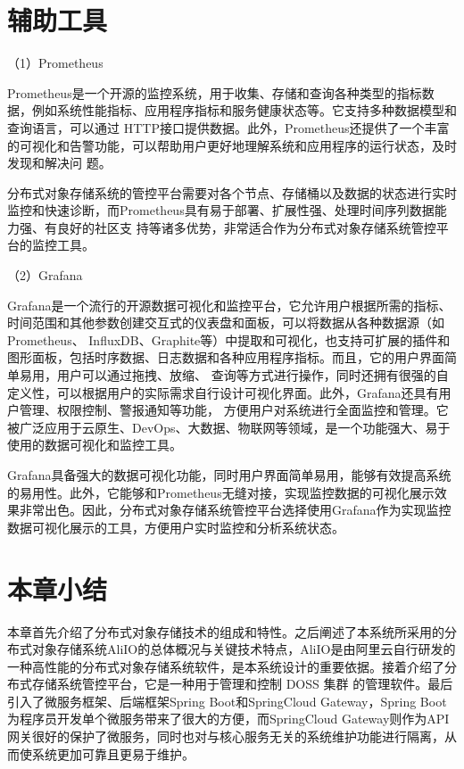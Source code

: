 \section{辅助工具}

（1）Prometheus

Prometheus是一个开源的监控系统，用于收集、存储和查询各种类型的指标数据\cite{kng2562eji}，例如系统性能指标、应用程序指标和服务健康状态等。它支持多种数据模型和查询语言，可以通过
HTTP接口提供数据。此外，Prometheus还提供了一个丰富的可视化和告警功能\cite{kongqingy2015keji}，可以帮助用户更好地理解系统和应用程序的运行状态，及时发现和解决问
题。

分布式对象存储系统的管控平台需要对各个节点、存储桶以及数据的状态进行实时监控和快速诊断，而Prometheus具有易于部署、扩展性强、处理时间序列数据能力强、有良好的社区支
持等诸多优势，非常适合作为分布式对象存储系统管控平台的监控工具。

（2）Grafana

Grafana是一个流行的开源数据可视化和监控平台，它允许用户根据所需的指标、时间范围和其他参数创建交互式的仪表盘和面板\cite{koing2keji}，可以将数据从各种数据源（如Prometheus、
InfluxDB、Graphite等）中提取和可视化，也支持可扩展的插件和图形面板，包括时序数据、日志数据和各种应用程序指标。而且，它的用户界面简单易用，用户可以通过拖拽、放缩、
查询等方式进行操作，同时还拥有很强的自定义性，可以根据用户的实际需求自行设计可视化界面。此外，Grafana还具有用户管理、权限控制、警报通知等功能，
方便用户对系统进行全面监控和管理\cite{koi56keji}。它被广泛应用于云原生、DevOps、大数据、物联网等领域，是一个功能强大、易于使用的数据可视化和监控工具。

Grafana具备强大的数据可视化功能，同时用户界面简单易用，能够有效提高系统的易用性。此外，它能够和Prometheus无缝对接，实现监控数据的可视化展示效果非常出色。因此，分布式对象存储系统管控平台选择使用Grafana作为实现监控数据可视化展示的工具，方便用户实时监控和分析系统状态。
\section{本章小结}

本章首先介绍了分布式对象存储技术的组成和特性。之后阐述了本系统所采用的分布式对象存储系统AliIO的总体概况与关键技术特点，AliIO是由阿里云自行研发的一种高性能的分布式对象存储系统软件，是本系统设计的重要依据。接着介绍了分布式存储系统管控平台，它是一种用于管理和控制 DOSS 集群
的管理软件。最后引入了微服务框架、后端框架Spring Boot和SpringCloud Gateway，Spring Boot为程序员开发单个微服务带来了很大的方便，而SpringCloud Gateway则作为API网关很好的保护了微服务，同时也对与核心服务无关的系统维护功能进行隔离，从而使系统更加可靠且更易于维护。


